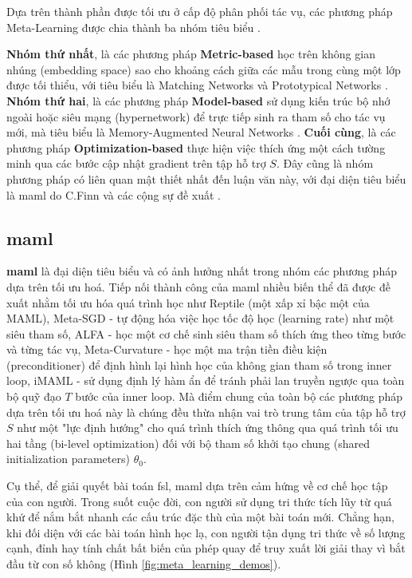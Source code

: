 Dựa trên thành phần được tối ưu ở cấp độ phân phối tác vụ, các phương pháp Meta-Learning được chia thành ba nhóm tiêu biểu \cite{gharoun2024meta}.

\textbf{Nhóm thứ nhất}, là các phương pháp \textbf{Metric-based} học trên không gian nhúng (embedding space) sao cho khoảng cách giữa các mẫu trong cùng một lớp được tối thiểu, với tiêu biểu là Matching Networks \cite{vinyals2016matching} và Prototypical Networks \cite{snell2017prototypical}. \textbf{Nhóm thứ hai}, là các phương pháp \textbf{Model-based} sử dụng kiến trúc bộ nhớ ngoài hoặc siêu mạng (hypernetwork) để trực tiếp sinh ra tham số cho tác vụ mới, mà tiêu biểu là Memory-Augmented Neural Networks \cite{santoro2016meta}. \textbf{Cuối cùng}, là các phương pháp \textbf{Optimization-based} thực hiện việc thích ứng một cách tường minh qua các bước cập nhật gradient trên tập hỗ trợ $S$. Đây cũng là nhóm phương pháp có liên quan mật thiết nhất đến luận văn này, với đại diện tiêu biểu là \acrshort{maml} do C.Finn và các cộng sự đề xuất \cite{finn2017model}.

\subsection{\acrfull{maml}}
\label{subsec:maml_define}

\textbf{\acrfull{maml}} \cite{finn2017model} là đại diện tiêu biểu và có ảnh hưởng nhất trong nhóm các phương pháp dựa trên tối ưu hoá. Tiếp nối thành công của \acrshort{maml} nhiều biến thể đã được đề xuất nhằm tối ưu hóa quá trình học như Reptile \cite{nichol2018first} (một xấp xỉ bậc một của MAML), Meta-SGD \cite{li2017meta} - tự động hóa việc học tốc độ học (learning rate) như một siêu tham số, ALFA \cite{baik2020meta} - học một cơ chế sinh siêu tham số thích ứng theo từng bước và từng tác vụ, Meta-Curvature \cite{park2019meta} - học một ma trận tiền điều kiện (preconditioner) để định hình lại hình học của không gian tham số trong inner loop, iMAML \cite{rajeswaran2019meta} - sử dụng định lý hàm ẩn để tránh phải lan truyền ngược qua toàn bộ quỹ đạo $T$ bước của inner loop. Mà điểm chung của toàn bộ các phương pháp dựa trên tối ưu hoá này là chúng đều thừa nhận vai trò trung tâm của tập hỗ trợ $S$ như một "lực định hướng" cho quá trình thích ứng thông qua quá trình tối ưu hai tầng (bi-level optimization) đối với bộ tham số khởi tạo chung (shared initialization parameters) $\theta_0$.

Cụ thể, để giải quyết bài toán \acrlong{fsl}, \acrshort{maml} dựa trên cảm hứng về cơ chế học tập của con người. Trong suốt cuộc đời, con người sử dụng tri thức tích lũy từ quá khứ để nắm bắt nhanh các cấu trúc đặc thù của một bài toán mới. Chẳng hạn, khi đối diện với các bài toán hình học lạ, con người tận dụng tri thức về số lượng cạnh, đỉnh hay tính chất bất biến của phép quay để truy xuất lời giải thay vì bắt đầu từ con số không (Hình \ref{fig:meta_learning_demos}).

